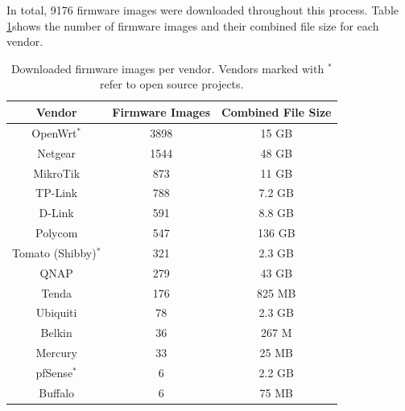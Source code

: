 In total, 9176 firmware images were downloaded throughout this process. Table \ref{tab:scraper}shows the number of firmware images and their combined file size for each vendor.

\begin{table}[H]
\centering
\caption{Downloaded firmware images per vendor. Vendors marked with $^*$ refer to open source projects.}
\begin{tabular}{|c|c|c|}
\hline
\textbf{Vendor} & \textbf{Firmware Images} & \textbf{Combined File Size} \\ \hline
OpenWrt$^*$     & 3898                     & 15 GB                       \\ 
Netgear         & 1544                     & 48 GB                       \\ 
MikroTik        & 873                      & 11 GB                       \\ 
TP-Link         & 788                      & 7.2 GB                      \\ 
D-Link          & 591                      & 8.8 GB                      \\ 
Polycom         & 547                      & 136 GB                      \\ 
Tomato (Shibby)$^*$ & 321                      & 2.3 GB                      \\ 
QNAP            & 279                      & 43 GB                       \\ 
Tenda           & 176                      & 825 MB                      \\ 
Ubiquiti        & 78                       & 2.3 GB                      \\ 
Belkin          & 36                       & 267 M                       \\ 
Mercury         & 33                       & 25 MB                       \\ 
pfSense$^*$     & 6                        & 2.2 GB                      \\ 
Buffalo         & 6                        & 75 MB                       \\ \hline

\end{tabular}
\label{tab:scraper}
\end{table}


